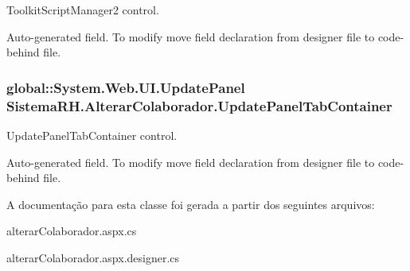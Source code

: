 ToolkitScriptManager2 control. 

Auto-\/generated field. To modify move field declaration from designer file to code-\/behind file. \hypertarget{class_sistema_r_h_1_1_alterar_colaborador_a494536807f39d7edd596cbf1fa42ac97}{
\subsubsection[{UpdatePanelTabContainer}]{\setlength{\rightskip}{0pt plus 5cm}global::System.Web.UI.UpdatePanel {\bf SistemaRH.AlterarColaborador.UpdatePanelTabContainer}}}
\label{class_sistema_r_h_1_1_alterar_colaborador_a494536807f39d7edd596cbf1fa42ac97}


UpdatePanelTabContainer control. 

Auto-\/generated field. To modify move field declaration from designer file to code-\/behind file. 

A documentação para esta classe foi gerada a partir dos seguintes arquivos:\begin{DoxyCompactItemize}
\item 
alterarColaborador.aspx.cs\item 
alterarColaborador.aspx.designer.cs\end{DoxyCompactItemize}
